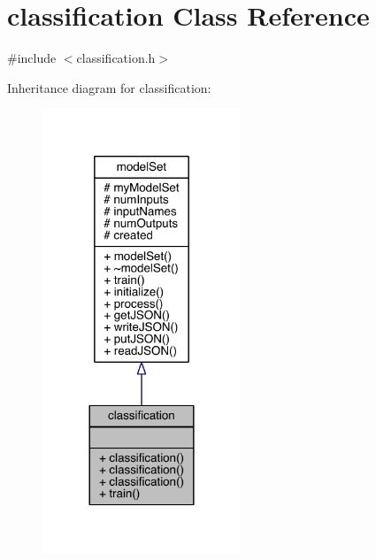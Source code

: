 \hypertarget{classclassification}{}\section{classification Class Reference}
\label{classclassification}


{\ttfamily \#include $<$classification.\+h$>$}



Inheritance diagram for classification\+:
\nopagebreak
\begin{figure}[H]
\begin{center}
\leavevmode
\includegraphics[width=168pt]{classclassification__inherit__graph}
\end{center}
\end{figure}


